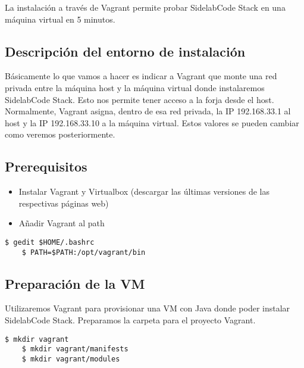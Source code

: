 \par La instalación a través de Vagrant permite probar SidelabCode Stack en una máquina virtual en 5 minutos.

\subsection{Descripción del entorno de instalación}
\label{sub:entorno-instalacion}

\par Básicamente lo que vamos a hacer es indicar a Vagrant que monte una red privada entre la máquina host y la máquina virtual donde instalaremos SidelabCode Stack. Esto nos permite tener acceso a la forja desde el host. Normalmente, Vagrant asigna, dentro de esa red privada, la IP 192.168.33.1 al host y la IP 192.168.33.10 a la máquina virtual. Estos valores se pueden cambiar como veremos posteriormente.

\subsection{Prerequisitos}
\label{sub:prerequisitos}

\begin{itemize}
    \item Instalar Vagrant y Virtualbox (descargar las últimas versiones de las respectivas páginas web)
    \item Añadir Vagrant al path
\end{itemize}

\lstset{style=bashbasico}
\begin{lstlisting}[frame=trbl]
    $ gedit $HOME/.bashrc
    $ PATH=$PATH:/opt/vagrant/bin
\end{lstlisting}

\subsection{Preparación de la VM}
\label{preparar-vm}

\par Utilizaremos Vagrant para provisionar una VM con Java donde poder instalar SidelabCode Stack. Preparamos la carpeta para el proyecto Vagrant.

\lstset{style=bashbasico}
\begin{lstlisting}[frame=trbl]
    $ mkdir vagrant
    $ mkdir vagrant/manifests
    $ mkdir vagrant/modules
\end{lstlisting}

